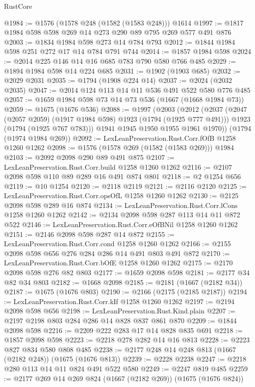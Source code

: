 \begin{lexlean}{RustCore}
\begin{coremodule}
@1984 := @1576 (@1578 @248 (@1582 (@1583 @248))) @1614
@1997 := @1817 @1984 @598 @598 @269 @14 @273 @290 @89 @795 @269 @577 @491 @876
@2003 := @1834 @1984 @598 @273 @14 @784 @793
@2012 := @1844 @1984 @598 @251 @272 @17 @14 @784 @791 @744
@2014 := @1857 @1984 @598
@2024 := @2014 @225 @146 @14 @16 @685 @783 @790 @580 @766 @485
@2029 := @1894 @1984 @598 @14 @224 @685
@2031 := @1902 (@1903 @685)
@2032 := @2029 @2031
@2035 := @1794 (@1908 @224 @14)
@2037 := @2024 (@2032 @2035)
@2047 := @2014 @124 @113 @14 @11 @536 @491 @522 @580 @776 @485
@2057 := @1659 @1984 @598 @73 @14 @73 @536 (@1667 (@1668 @1984 @73))
@2059 := @1675 (@1676 @536)
@2088 := @1997
    (@2003
      (@2012
        (@2037
          (@2047 (@2057 @2059) (@1917 @1984 @598) @1923 (@1794 (@1925 @777 @491)))
          @1923
          (@1794 (@1925 @767 @783)))
        @1941
        @1945
        @1950
        @1955
        @1961
        @1970))
    (@1794 (@1974 @1984 @269))
@2092 := LexLeanPreservation.Rust.Corr.fOfB @1258 @1260 @1262
@2098 := @1576 (@1578 @269 (@1582 (@1583 @269))) @1984
@2103 := @2092 @2098 @290 @89 @491 @875
@2107 := LexLeanPreservation.Rust.Corr.build @1258 @1260 @1262
@2116 := @2107 @2098 @598 @110 @89 @289 @16 @491 @874 @801
@2118 := @2 @1254 @656
@2119 := @10 @1254
@2120 := @2118 @2119
@2121 := @2116 @2120
@2125 := LexLeanPreservation.Rust.Corr.opsOfL @1258 @1260 @1262
@2130 := @2125 @2098 @598 @289 @16 @874
@2134 := LexLeanPreservation.Rust.Corr.lCons @1258 @1260 @1262
@2142 := @2134 @2098 @598 @287 @113 @14 @11 @872 @522
@2146 := LexLeanPreservation.Rust.Corr.eOfBNil @1258 @1260 @1262
@2151 := @2146 @2098 @598 @287 @14 @872
@2155 := LexLeanPreservation.Rust.Corr.cond @1258 @1260 @1262
@2166 := @2155 @2098 @598 @656 @276 @284 @286 @14 @491 @803 @491 @872
@2170 := LexLeanPreservation.Rust.Corr.bOfE @1258 @1260 @1262
@2175 := @2170 @2098 @598 @276 @82 @803
@2177 := @1659 @2098 @598
@2181 := @2177 @34 @82 @34 @803
@2182 := @1668 @2098
@2185 := @2181 (@1667 (@2182 @34))
@2187 := @1675 (@1676 @803)
@2190 := @2166 (@2175 (@2185 @2187))
@2194 := LexLeanPreservation.Rust.Corr.kIf @1258 @1260 @1262
@2197 := @2194 @2098 @598 @656
@2198 := LexLeanPreservation.Rust.Kind.plain
@2207 := @2197 @2198 @803 @284 @286 @14 @828 @837 @861 @870
@2209 := @1844 @2098 @598
@2216 := @2209 @222 @283 @17 @14 @828 @835 @691
@2218 := @1857 @2098 @598
@2223 := @2218 @278 @282 @14 @16 @813
@2228 := @2223 @827 @834 @580 @808 @485
@2238 := @2177 @248 @14 @248 @813 (@1667 (@2182 @248)) (@1675 (@1676 @813))
@2239 := @2228 @2238
@2247 := @2218 @280 @113 @14 @11 @824 @491 @522 @580
@2249 := @2247 @819 @485
@2259 := @2177 @269 @14 @269 @824 (@1667 (@2182 @269)) (@1675 (@1676 @824))

\end{coremodule}
\end{lexlean}
